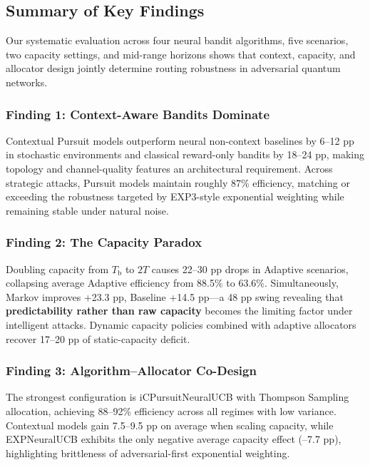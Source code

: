 \documentclass[sigconf,anonymous]{acmart}
\newcommand{\Tb}{T_{\text{b}}}
\newcommand{\TwoT}{2T}
\begin{document}
\subsection{Summary of Key Findings}

Our systematic evaluation across four neural bandit algorithms, five scenarios, two capacity settings, and mid-range horizons shows that context, capacity, and allocator design jointly determine routing robustness in adversarial quantum networks.

\subsubsection{Finding 1: Context-Aware Bandits Dominate}

Contextual Pursuit models outperform neural non-context baselines by 6--12 pp in stochastic environments and classical reward-only bandits by 18--24 pp, making topology and channel-quality features an architectural requirement. Across strategic attacks, Pursuit models maintain roughly 87\% efficiency, matching or exceeding the robustness targeted by EXP3-style exponential weighting while remaining stable under natural noise.

\subsubsection{Finding 2: The Capacity Paradox}

Doubling capacity from $\Tb$ to $\TwoT$ causes 22--30 pp drops in Adaptive scenarios, collapsing average Adaptive efficiency from 88.5\% to 63.6\%. Simultaneously, Markov improves +23.3 pp, Baseline +14.5 pp—a 48 pp swing revealing that \textbf{predictability rather than raw capacity} becomes the limiting factor under intelligent attacks. Dynamic capacity policies combined with adaptive allocators recover 17--20 pp of static-capacity deficit.

\subsubsection{Finding 3: Algorithm--Allocator Co-Design}

The strongest configuration is iCPursuitNeuralUCB with Thompson Sampling allocation, achieving 88--92\% efficiency across all regimes with low variance. Contextual models gain 7.5--9.5 pp on average when scaling capacity, while EXPNeuralUCB exhibits the only negative average capacity effect (--7.7 pp), highlighting brittleness of adversarial-first exponential weighting.
\end{document}
